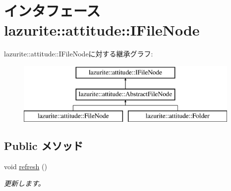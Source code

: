 \hypertarget{interfacelazurite_1_1attitude_1_1_i_file_node}{
\section{インタフェース lazurite::attitude::IFileNode}
\label{interfacelazurite_1_1attitude_1_1_i_file_node}
}
lazurite::attitude::IFileNodeに対する継承グラフ:\begin{figure}[H]
\begin{center}
\leavevmode
\includegraphics[height=3cm]{interfacelazurite_1_1attitude_1_1_i_file_node}
\end{center}
\end{figure}
\subsection*{Public メソッド}
\begin{DoxyCompactItemize}
\item 
void \hyperlink{interfacelazurite_1_1attitude_1_1_i_file_node_ae6703f58ed2388eafcfce1c5947498e6}{refresh} ()
\begin{DoxyCompactList}\small\item\em 更新します。 \item\end{DoxyCompactList}\end{DoxyCompactItemize}
